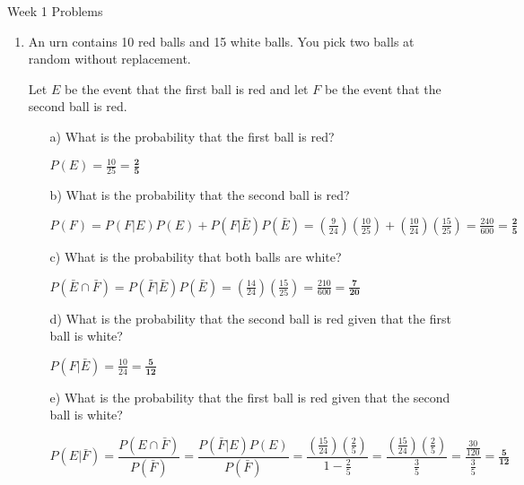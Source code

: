 \documentclass[10pt,a4paper]{article}
\author{Patrick Lam}
\newcommand{\red}{\color{red}}
\newcommand{\black}{\color{black}}
\begin{document}
\begin{center}
\begin{Large}Week 1 Problems\end{Large}
\end{center}
\bigskip
\begin{enumerate}

\item An urn contains 10 red balls and 15 white balls. You pick two balls at random without replacement. 

\medskip
\red
Let $E$ be the event that the first ball is red and let $F$ be the
event that the second ball is red.
\black 

\begin{enumerate}
\item[a)] What is the probability that the first ball is red?

\medskip \red
$P(E) = \frac{10}{25} = \mathbf{\frac{2}{5}}$
\medskip \black 

\item[b)] What is the probability that the second ball is red?

\medskip \red
$P(F) = P(F|E) P(E) + P(F|\bar{E}) P(\bar{E}) = \left( \frac{9}{24}
\right) \left( \frac{10}{25} \right) + \left( \frac{10}{24} \right)
\left( \frac{15}{25} \right) = \frac{240}{600} = \mathbf{\frac{2}{5}}$
\medskip \black 

\item[c)] What is the probability that both balls are white?

\medskip \red
$P(\bar{E} \cap \bar{F}) = P(\bar{F} | \bar{E}) P(\bar{E}) = \left(
\frac{14}{24} \right) \left( \frac{15}{25} \right) = \frac{210}{600} =
\mathbf{\frac{7}{20}}$
\medskip \black 

\item[d)] What is the probability that the second ball is red given that the first ball is white?

\medskip \red
$P(F|\bar{E}) = \frac{10}{24} = \mathbf{\frac{5}{12}}$
\medskip \black 

\item[e)] What is the probability that the first ball is red given that the second ball is white?

\medskip \red
$P(E|\bar{F}) = \dfrac{P(E \cap \bar{F})}{P(\bar{F})} =
\dfrac{P(\bar{F}|E)P(E)}{P(\bar{F})} = \dfrac{\left( \frac{15}{24}
\right) \left( \frac{2}{5} \right)}{1 - \frac{2}{5}} = \dfrac{\left(
\frac{15}{24} \right) \left( \frac{2}{5} \right)}{\frac{3}{5}} =
\dfrac{\frac{30}{120}}{\frac{3}{5}} = \mathbf{\frac{5}{12}}$
\medskip \black 


\end{enumerate}
\end{enumerate}
\end{document}
